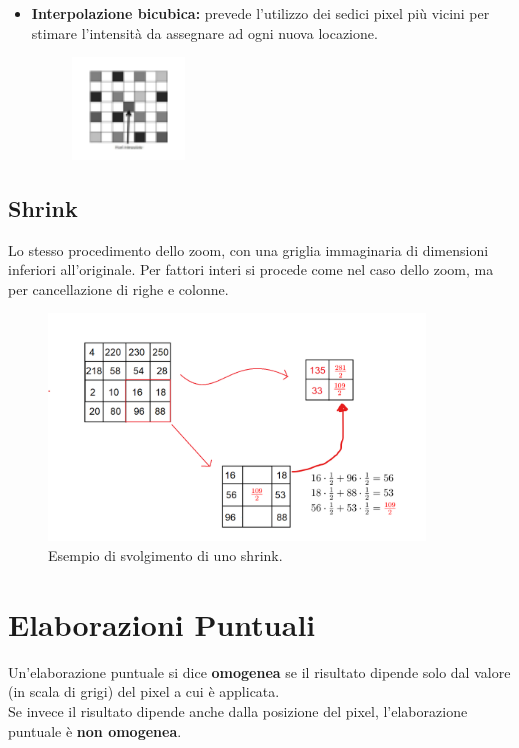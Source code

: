 \begin{itemize}
    \item \textbf{Interpolazione bicubica:} prevede l'utilizzo dei sedici pixel
          più vicini per stimare l'intensità da assegnare ad ogni nuova
          locazione.

          \begin{figure}[H]
              \centering
              \includegraphics[width=3cm, keepaspectratio]{capitoli/immagini/imgs/interpolazione-bicubica.png}
          \end{figure}

\end{itemize}


\subsection{Shrink}

Lo stesso procedimento dello zoom, con una griglia immaginaria di dimensioni inferiori all'originale.
Per fattori interi si procede come nel caso dello zoom, ma per cancellazione di righe e colonne.

\begin{figure}[H]
    \centering
    \includegraphics[width=10cm, keepaspectratio]{capitoli/immagini/imgs/calcolo_shrink.png}
    \caption{Esempio di svolgimento di uno shrink.}
\end{figure}

\section{Elaborazioni Puntuali}

\begin{definition}
    Un'elaborazione puntuale si dice \textbf{omogenea} se il risultato
    dipende solo dal valore (in scala di grigi) del pixel a cui è applicata.\\
    Se invece il risultato dipende anche dalla posizione del pixel,
    l'elaborazione puntuale è \textbf{non omogenea}.
\end{definition}

